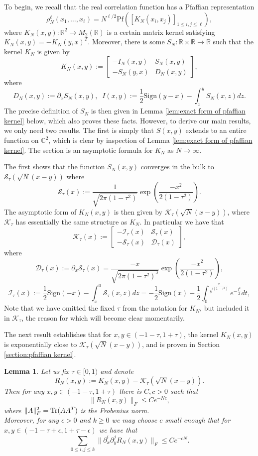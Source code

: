 \documentclass[12pt]{article}
\newcommand{\R}{\mathbb{R}}
\newcommand{\C}{\mathbb{C}}
\newcommand{\Tr}{\text{\rm Tr}}
\newtheorem{lem}[info]{Lemma}
\numberwithin{info}{section}
\numberwithin{equation}{section}
\renewcommand{\[}{\begin{equation}}
\renewcommand{\]}{\end{equation}}
\renewcommand{\cal}{\mathcal}
\newcommand{\sq}{\sqrt}
\newcommand{\sign}{\mathrm{Sign}}
\newcommand{\<}{\langle}
\renewcommand{\>}{\rangle}
\renewcommand{\sq}{\sqrt}
\newcommand{\pf}{\mathrm{Pf}}
\begin{document}
	To begin, we recall \cite{forrester-elliptic} that the real correlation function has a Pfaffian representation
	\[\rho^{\ell}_N(x_1,\dots,x_\ell)=N^{\ell/2}\pf([K_N(x_i,x_j)]_{1\le i,j\le \ell}),\label{eqn:even Pfaffian formula}\]
	where $K_N(x,y):\R^2\to M_2(\R)$ is a certain matrix kernel satisfying $K_N(x,y)=-K_N(y,x)^T$. Moreover, there is some $S_N:\R\times \R\to \R$ such that the kernel $K_N$ is given by
	\[K_N(x,y):=\begin{bmatrix}
		-I_N(x,y)& S_N(x,y)\\
		-S_N(y,x)& D_N(x,y)
	\end{bmatrix},\label{eqn:Pfaffian K-def}\]
	where
	\[D_N(x,y):=\partial_x S_N(x,y),\;\; I(x,y):=\frac{1}{2}\sign(y-x)-\int_x^y S_N(x,z)dz.\label{eqn:Pfaffian I and D def}\]
	The precise definition of $S_N$ is then given in Lemma \ref{lem:exact form of pfaffian kernel} below, which also proves these facts. However, to derive our main results, we only need two results. The first is simply that $S(x,y)$ extends to an entire function on $\C^2$, which is clear by inspection of Lemma \ref{lem:exact form of pfaffian kernel}. The section is an asymptotic formula for $K_N$ as $N\to \infty$.
	
	The first shows that the function $S_N(x,y)$ converges in the bulk to $\cal{S}_{\tau}(\sqrt{N}(x-y))$ where
	\[\cal{S}_{\tau}(x):=\frac{1}{\sq{2\pi(1-\tau^2)}}\exp \left(\frac{-x^2}{2(1-\tau^2)}\right).\]
	The asymptotic form of $K_N(x,y)$ is then given by $\cal{K}_{\tau}(\sqrt{N}(x-y))$, where $\cal{K}_{\tau}$ has essentially the same structure as $K_N$. In particular we have that
	\[\cal{K}_{\tau}(x):=\begin{bmatrix}
		-\cal{I}_{\tau}(x)& \cal{S}_{\tau}(x)\\
		-\cal{S}_{\tau}(x)& \cal{D}_{\tau}(x)
	\end{bmatrix},\]
	where
	\[\cal{D}_{\tau}(x):=\partial_x \cal{S}_{\tau}(x)=\frac{-x}{\sq{2\pi(1-\tau^2)^3}}\exp \left(\frac{-x^2}{2(1-\tau^2)}\right),\label{eqn:Pfaffian pure D}\]
	\[\cal{I}_{\tau}(x):=\frac{1}{2}\sign(-x)-\int_x^0 \cal{S}_{\tau}(x,z)dz=-\frac{1}{2}\sign(x)+\frac{1}{2}\int_0^{\frac{x}{\sqrt{(1- \tau
				^2)}}}e^{-\frac{t^2}{2}}dt,\label{eqn:Pfaffian pure I}\]
	Note that we have omitted the fixed $\tau$ from the notation for $K_N$, but included it in $\cal{K}_{\tau}$, the reason for which will become clear momentarily.
	
	The next result establishes that for $x,y\in (-1-\tau,1+\tau)$, the kernel $K_N(x,y)$ is exponentially close to $\cal{K}_{\tau}(\sq{N}(x-y))$, and is proven in Section \ref{section:pfaffian kernel}.
	\begin{lem}
		\label{lem:error estimate for Pfaffian kernel}
		Let us fix $\tau\in [0,1)$ and denote
		\[R_N(x,y):=K_N(x,y)-\cal{K}_{\tau}(\sq{N}(x-y)).\]
		Then for any $x,y\in (-1-\tau,1+\tau)$ there is $C,c>0$ such that
		\[\|R_N(x,y)\|_F\le Ce^{-Nc},\]
		where $\|A\|_F^2=\Tr(AA^T)$ is the Frobenius norm.\\
		Moreover, for any $\epsilon>0$ and $k\ge 0$ we may choose $c$ small enough that for $x,y\in (-1-\tau+\epsilon,1+\tau-\epsilon)$ we have that
		\[\sum_{0\le i,j\le k}\|\partial_x^i\partial_y^jR_N(x,y)\|_F\le Ce^{-cN}.\]
	\end{lem}
	
\end{document}
